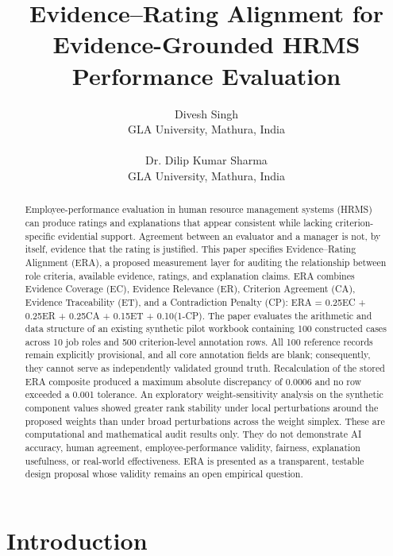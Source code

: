 \documentclass[
  10pt,
  runningheads]{llncs}
\title{Evidence--Rating Alignment for Evidence-Grounded HRMS Performance Evaluation}
\author{Divesh Singh\\
GLA University, Mathura, India\\
\email{divesh.singh\_phd.cs24@gla.ac.in}\\[8pt]
Dr. Dilip Kumar Sharma\\
GLA University, Mathura, India\\
\email{dilip.sharma@gla.ac.in}}
\institute{}
\date{}
\begin{document}
\setlength{\parskip}{0pt}
\setlength{\parindent}{1em}
\maketitle
\begin{abstract}

Employee-performance evaluation in human resource management systems
(HRMS) can produce ratings and explanations that appear consistent while
lacking criterion-specific evidential support. Agreement between an
evaluator and a manager is not, by itself, evidence that the rating is
justified. This paper specifies Evidence--Rating Alignment (ERA), a
proposed measurement layer for auditing the relationship between role
criteria, available evidence, ratings, and explanation claims. ERA
combines Evidence Coverage (EC), Evidence Relevance (ER), Criterion
Agreement (CA), Evidence Traceability (ET), and a Contradiction Penalty
(CP): ERA = 0.25EC + 0.25ER + 0.25CA + 0.15ET + 0.10(1-CP). The paper
evaluates the arithmetic and data structure of an existing synthetic
pilot workbook containing 100 constructed cases across 10 job roles and
500 criterion-level annotation rows. All 100 reference records remain
explicitly provisional, and all core annotation fields are blank;
consequently, they cannot serve as independently validated ground truth.
Recalculation of the stored ERA composite produced a maximum absolute
discrepancy of 0.0006 and no row exceeded a 0.001 tolerance. An
exploratory weight-sensitivity analysis on the synthetic component
values showed greater rank stability under local perturbations around
the proposed weights than under broad perturbations across the weight
simplex. These are computational and mathematical audit results only.
They do not demonstrate AI accuracy, human agreement,
employee-performance validity, fairness, explanation usefulness, or
real-world effectiveness. ERA is presented as a transparent, testable
design proposal whose validity remains an open empirical question.

\end{abstract}

\section{Introduction}\label{introduction}
\end{document}
